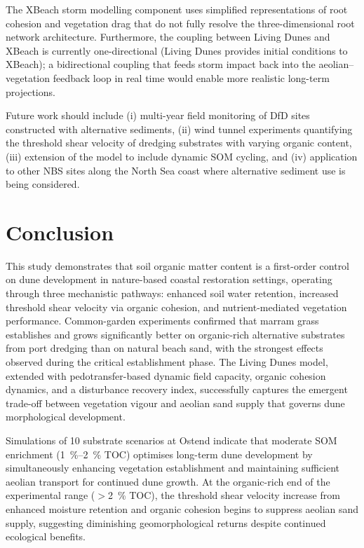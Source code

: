 \documentclass[authoryear,preprint,review,12pt]{elsarticle}
\begin{document}
The XBeach storm modelling component uses simplified representations of root cohesion and vegetation drag that do not fully resolve the three-dimensional root network architecture. Furthermore, the coupling between Living Dunes and XBeach is currently one-directional (Living Dunes provides initial conditions to XBeach); a bidirectional coupling that feeds storm impact back into the aeolian--vegetation feedback loop in real time would enable more realistic long-term projections.

Future work should include (i) multi-year field monitoring of DfD sites constructed with alternative sediments, (ii) wind tunnel experiments quantifying the threshold shear velocity of dredging substrates with varying organic content, (iii) extension of the model to include dynamic SOM cycling, and (iv) application to other NBS sites along the North Sea coast where alternative sediment use is being considered.


\section{Conclusion}

This study demonstrates that soil organic matter content is a first-order control on dune development in nature-based coastal restoration settings, operating through three mechanistic pathways: enhanced soil water retention, increased threshold shear velocity via organic cohesion, and nutrient-mediated vegetation performance. Common-garden experiments confirmed that marram grass establishes and grows significantly better on organic-rich alternative substrates from port dredging than on natural beach sand, with the strongest effects observed during the critical establishment phase. The Living Dunes model, extended with pedotransfer-based dynamic field capacity, organic cohesion dynamics, and a disturbance recovery index, successfully captures the emergent trade-off between vegetation vigour and aeolian sand supply that governs dune morphological development.

Simulations of 10 substrate scenarios at Ostend indicate that moderate SOM enrichment (\SIrange{1}{2}{\percent} TOC) optimises long-term dune development by simultaneously enhancing vegetation establishment and maintaining sufficient aeolian transport for continued dune growth. At the organic-rich end of the experimental range ($>$\SI{2}{\percent} TOC), the threshold shear velocity increase from enhanced moisture retention and organic cohesion begins to suppress aeolian sand supply, suggesting diminishing geomorphological returns despite continued ecological benefits.
\end{document}
